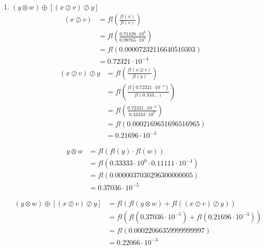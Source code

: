 \documentclass[12pt]{article}
\begin{document}
\begin{enumerate}
    \item $(y \otimes w) \oplus [(x \oslash v) \oslash y]$
    \[
        \begin{aligned}
            (x \oslash v) &= fl\left(\frac{fl(x)}{fl(v)}\right)\\
                          &= fl\left( \frac{0.71428 \cdot 10^{0}}{0.98765 \cdot 10^{5}} \right)\\
                          &= fl(0.00007232116640510303)\\
                          &= 0.72321 \cdot 10^{-4}
        \end{aligned}
    \]
    \[  
        \begin{aligned}
            (x \oslash v) \oslash y &= fl \left( \frac{fl(x \oslash v)}{fl(y)}   \right)\\
                                    &= fl \left(\frac{fl(0.72321 \cdot 10^{-4})}{fl(0.333\dots)} \right) \\
                                    &= fl \left(\frac{0.72321 \cdot 10^{-4}}{0.33333 \cdot 10^{0}} \right)\\
                                    &= fl (0.0002169651696516965)  \\
                                    &= 0.21696 \cdot 10^{-3}   
        \end{aligned}
    \]

    \[
        \begin{aligned}
            y \otimes w &= fl(fl(y) \cdot fl(w))\\
                        &= fl(0.33333 \cdot 10^{0} \cdot 0.11111\cdot10^{-4})\\
                        &= fl(0.0000037036296300000005)\\
                        &= 0.37036 \cdot 10^{-5}
        \end{aligned}
    \]

    \[
        \begin{aligned}
        (y \otimes w) \oplus [(x \oslash v) \oslash y] &= fl(fl(y \otimes w) + fl((x \oslash v) \oslash y))\\
                                                       &= fl(fl(0.37036 \cdot 10^{-5}) + fl(0.21696 \cdot 10^{-3}))\\
                                                       &= fl(0.00022066359999999997)\\
                                                       &= 0.22066 \cdot 10^{-3}
        \end{aligned}
    \]
\end{enumerate}
\end{document}
